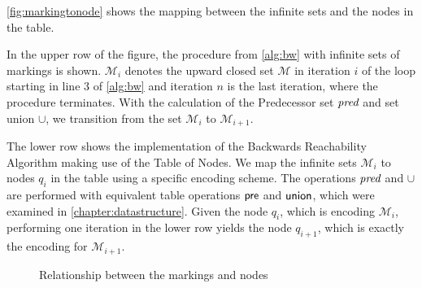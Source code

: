 \par 

\autoref{fig:markingtonode} shows the mapping between the infinite sets and the nodes in the table. 
\par 

In the upper row of the figure, the procedure from \autoref{alg:bw} with infinite sets of markings is shown. 
$\mathcal{M}_{i}$ denotes the upward closed set $\mathcal{M}$ in iteration $i$ of the loop starting in line 3 of \autoref{alg:bw} and iteration $n$ is the last iteration, where the procedure terminates. With the calculation of the Predecessor set $\operatorname{\textit{pred}}$ and set union $\cup$, we transition from the set $\mathcal{M}_{i}$  to $\mathcal{M}_{i+1}$.

\par 

The lower row shows the implementation of the Backwards Reachability Algorithm making use of the Table of Nodes. We map the infinite sets $\mathcal{M}_{i}$ to nodes $q_{i}$ in the table using a specific encoding scheme. The operations $\operatorname{\textit{pred}}$ and $\cup$ are performed with equivalent table operations $\operatorname{\textsf{pre}}$ and $\operatorname{\textsf{union}}$, which were examined in \autoref{chapter:datastructure}.
Given the node $q_{i}$, which is encoding $\mathcal{M}_{i}$, performing one iteration in the lower row yields the node $q_{i+1}$, which is exactly the encoding for $\mathcal{M}_{i+1}$.


\begin{figure}[htb]
\centering
\caption{Relationship between the markings and nodes}\label{fig:markingtonode}
\end{figure}

\par

